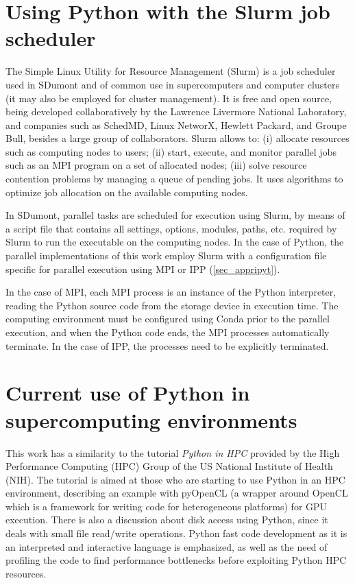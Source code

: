 %
%
%
\section{Using Python with the Slurm job scheduler}

The Simple Linux Utility for Resource Management (Slurm) is a job scheduler used in SDumont and of common use in supercomputers and computer clusters (it may also be employed for cluster management). It is free and open source, being developed collaboratively by the Lawrence Livermore National Laboratory, and companies such as SchedMD, Linux NetworX, Hewlett Packard, and Groupe Bull, besides a large group of collaborators. Slurm allows to: (i) allocate resources such as computing nodes to users; (ii) start, execute, and monitor parallel jobs such as an MPI program on a set of allocated nodes; (iii) solve resource contention problems by managing a queue of pending jobs. It uses algorithms to optimize job allocation on the available computing nodes.

In SDumont, parallel tasks are scheduled for execution using Slurm, by means of a script file that contains all settings, options, modules, paths, etc. required by Slurm to run the executable on the computing nodes. In the case of Python, the parallel implementations of this work employ Slurm with a configuration file specific for parallel execution using MPI or IPP (\autoref {sec_appripyt}). 

In the case of MPI, each MPI process is an instance of the Python interpreter, reading the Python source code from the storage device in execution time. The computing environment must be configured using Conda prior to the parallel execution, and when the Python code ends, the MPI processes automatically terminate. In the case of IPP, the processes need to be explicitly terminated.

%
%
%
\section{Current use of Python in supercomputing environments}
\label{sec_stateofart}

This work has a similarity to the tutorial \textit {Python in HPC} \cite {Resch20} provided by the High Performance Computing (HPC) Group of the US National Institute of Health (NIH). The tutorial is aimed at those who are starting to use Python in an HPC environment, describing an example with pyOpenCL (a wrapper around OpenCL which is a framework for writing code for heterogeneous platforms) for GPU execution. There is also a discussion about disk access using Python, since it deals with small file read/write operations. Python fast code development as it is an interpreted and interactive language is emphasized, as well as the need of profiling the code to find performance bottlenecks before exploiting Python HPC resources.

